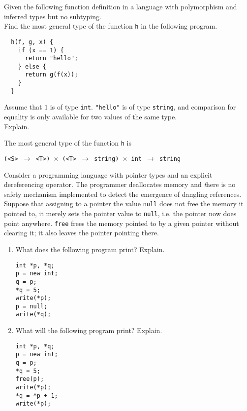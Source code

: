 \documentclass[11pt]{exam}
\begin{document}
\begin{questions}

      \question Given the following function definition in a language
        with polymorphism and inferred types but no subtyping.\\
        Find the most general type of the function {\tt h} in the following program.
\begin{lstlisting}
  h(f, g, x) {
    if (x == 1) {
      return "hello";
    } else {
      return g(f(x));
    }
  }
\end{lstlisting}
        Assume that $1$ is of type {\tt int}. {\tt "hello"} is of type {\tt string},
        and comparison for equality is only available for two values of the same type. \\
        Explain.

	\begin{framed}

            The most general type of the function {\tt h} is 
            
            {\tt (<S> $\to$ <T>) $\times$ (<T> $\to$ string) $\times$ int $\to$ string}

	\end{framed}


	\question Consider a programming language with pointer types and an explicit dereferencing operator. The programmer deallocates memory and {\emph there is no safety mechanism implemented to detect the emergence of dangling references}. Suppose that assigning to a pointer the value {\tt null} does not free the memory it pointed to, it merely sets the pointer value to {\tt null}, i.e. the pointer now does point anywhere. {\tt free} frees the memory pointed to by a given pointer without clearing it; it also leaves the pointer pointing there.

      \begin{enumerate}[label=(\roman*)]
      \item What does the following program print? Explain.
\begin{lstlisting}
int *p, *q;
p = new int;
q = p;
*q = 5;
write(*p);
p = null;
write(*q);
\end{lstlisting}

            \item What will the following program print? Explain.
\begin{lstlisting}
int *p, *q;
p = new int;
q = p;
*q = 5;
free(p);
write(*p);
*q = *p + 1;
write(*p);
\end{lstlisting}


\end{enumerate}
\end{questions}
\end{document}
